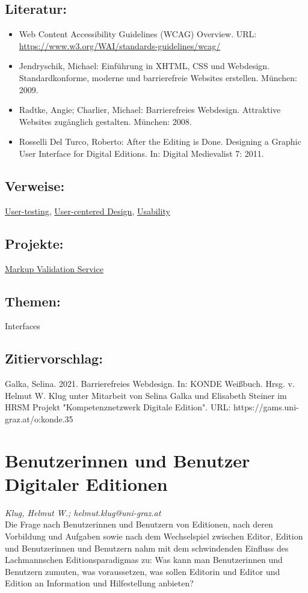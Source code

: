 \documentclass{article}
\begin{document}
        \subsection*{Literatur:}\begin{itemize}\item Web Content Accessibility Guidelines (WCAG) Overview. URL: \url{https://www.w3.org/WAI/standards-guidelines/wcag/}\item Jendryschik, Michael: Einführung in XHTML, CSS und Webdesign. Standardkonforme, moderne und barrierefreie Websites erstellen. München: 2009.\item Radtke, Angie; Charlier, Michael: Barrierefreies Webdesign. Attraktive Websites zugänglich gestalten. München: 2008.\item Rosselli Del Turco, Roberto: After the Editing is Done. Designing a Graphic User Interface for Digital Editions. In: Digital Medievalist 7: 2011.\end{itemize}\subsection*{Verweise:}\href{https://gams.uni-graz.at/o:konde.206}{User-testing}, \href{https://gams.uni-graz.at/o:konde.207}{User-centered Design}, \href{https://gams.uni-graz.at/o:konde.205}{Usability}\subsection*{Projekte:}\href{https://validator.w3.org}{Markup Validation Service}\subsection*{Themen:}Interfaces\subsection*{Zitiervorschlag:}Galka, Selina. 2021. Barrierefreies Webdesign. In: KONDE Weißbuch. Hrsg. v. Helmut W. Klug unter Mitarbeit von Selina Galka und Elisabeth Steiner im HRSM Projekt "Kompetenznetzwerk Digitale Edition". URL: https://gams.uni-graz.at/o:konde.35\newpage\section*{Benutzerinnen und Benutzer Digitaler Editionen} \emph{Klug, Helmut W.; helmut.klug@uni-graz.at    }\\
        
    Die Frage nach Benutzerinnen und Benutzern von Editionen, nach deren Vorbildung und Aufgaben sowie nach dem Wechselspiel zwischen Editor, Edition und Benutzerinnen und Benutzern nahm mit dem schwindenden Einfluss des Lachmannschen Editionsparadigmas zu: Was kann man Benutzerinnen und Benutzern zumuten, was voraussetzen, was sollen Editorin und Editor und Edition an Information und Hilfestellung anbieten? \\
            
\end{document}
